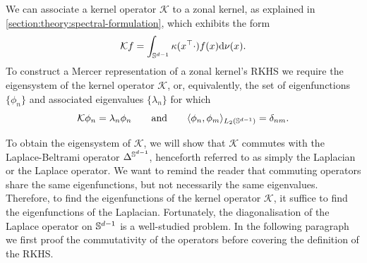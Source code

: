We can associate a kernel operator $\mathcal{K}$ to a zonal kernel, as explained in \cref{section:theory:spectral-formulation}, which exhibits the form
\begin{equation}
    \label{eq:kernel-operator-zonal}
  \mathcal{K} f = \int_{\mathbb{S}^{d-1}} \kappa(x^{\top}\cdot) f(x) \mathrm{d}{\nu(x)}.
\end{equation}
To construct a Mercer representation of a zonal kernel's RKHS we require the eigensystem of the kernel operator $\mathcal{K}$, or, equivalently, the set of eigenfunctions $\{\phi_n\}$ and associated eigenvalues $\{\lambda_n\}$ for which
\begin{equation}
    \mathcal{K} \phi_n = \lambda_n \phi_n\qquad\text{and}\qquad \langle \phi_n, \phi_m \rangle_{L_2(\mathbb{S}^{d-1})} = \delta_{nm}.
\end{equation}

To obtain the eigensystem of $\mathcal{K}$, we will show that $\mathcal{K}$ commutes with the Laplace-Beltrami operator $\Delta^{\mathbb{S}^{d-1}}$, henceforth referred to as simply the Laplacian or the Laplace operator. We want to remind the reader that commuting operators share the same eigenfunctions, but not necessarily the same eigenvalues. Therefore, to find the eigenfunctions of the kernel operator $\mathcal{K}$, it suffice to find the eigenfunctions of the Laplacian. Fortunately, the diagonalisation of the Laplace operator on $\mathbb{S}^{d-1}$ is a well-studied problem. In the following paragraph we first proof the commutativity of the operators before covering the definition of the RKHS.


